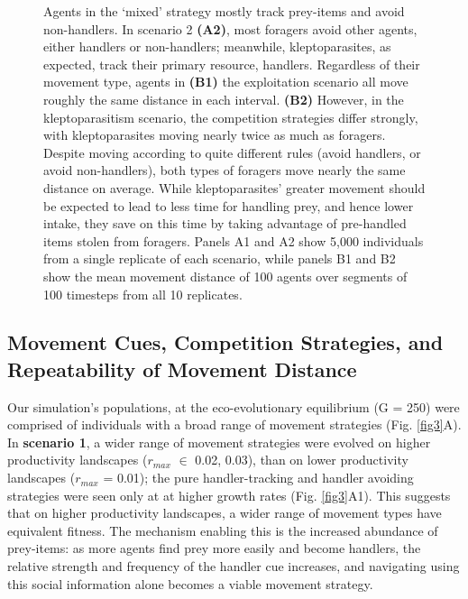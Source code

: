 \begin{figure}[h!]
{            Agents in the `mixed' strategy mostly track prey-items and avoid non-handlers.
            In scenario 2 \textbf{(A2)}, most foragers avoid other agents, either handlers or non-handlers; meanwhile, kleptoparasites, as expected, track their primary resource, handlers.
            Regardless of their movement type, agents in \textbf{(B1)} the exploitation scenario all move roughly the same distance in each interval.
            \textbf{(B2)} However, in the kleptoparasitism scenario, the competition strategies differ strongly, with kleptoparasites moving nearly twice as much as foragers.
            Despite moving according to quite different rules (avoid handlers, or avoid non-handlers), both types of foragers move nearly the same distance on average.
            While kleptoparasites' greater movement should be expected to lead to less time for handling prey, and hence lower intake, they save on this time by taking advantage of pre-handled items stolen from foragers.
            Panels A1 and A2 show 5,000 individuals from a single replicate of each scenario, while panels B1 and B2 show the mean movement distance of 100 agents over segments of 100 timesteps from all 10 replicates.
        }
        \label{fig2}
    \end{figure}
    
    \subsection*{Movement Cues, Competition Strategies, and Repeatability of Movement Distance}
    
    Our simulation's populations, at the eco-evolutionary equilibrium (G = 250) were comprised of individuals with a broad range of movement strategies (Fig. \ref{fig3}A).
    In \textbf{scenario 1}, a wider range of movement strategies were evolved on higher productivity landscapes ($r_{max}$ $\in$ 0.02, 0.03), than on lower productivity landscapes ($r_{max}$ = 0.01); the pure handler-tracking and handler avoiding strategies were seen only at at higher growth rates (Fig. \ref{fig3}A1).
    This suggests that on higher productivity landscapes, a wider range of movement types have equivalent fitness.
    The mechanism enabling this is the increased abundance of prey-items: as more agents find prey more easily and become handlers, the relative strength and frequency of the handler cue increases, and navigating using this social information alone becomes a viable movement strategy.
    
